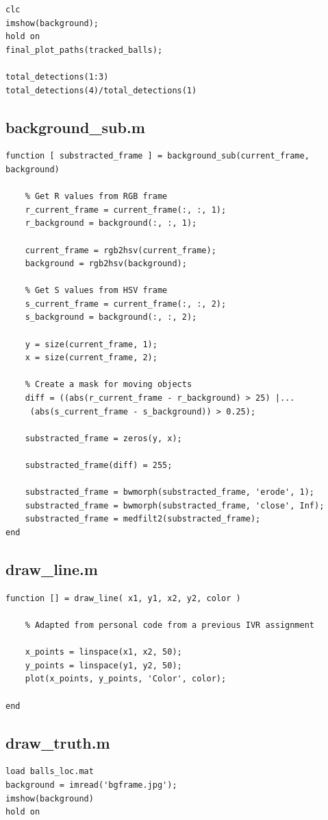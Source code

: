 \documentclass[12pt,a4paper]{article}
\begin{document}
\begin{appendices}
\begin{verbatim}
clc
imshow(background);
hold on
final_plot_paths(tracked_balls);

total_detections(1:3)
total_detections(4)/total_detections(1)
\end{verbatim}

\subsection{background\_sub.m}
\begin{verbatim}
function [ substracted_frame ] = background_sub(current_frame, background)

    % Get R values from RGB frame
    r_current_frame = current_frame(:, :, 1);
    r_background = background(:, :, 1);
    
    current_frame = rgb2hsv(current_frame);
    background = rgb2hsv(background);
    
    % Get S values from HSV frame
    s_current_frame = current_frame(:, :, 2);
    s_background = background(:, :, 2);
    
    y = size(current_frame, 1);
    x = size(current_frame, 2);
    
    % Create a mask for moving objects
    diff = ((abs(r_current_frame - r_background) > 25) |...
     (abs(s_current_frame - s_background)) > 0.25);
    
    substracted_frame = zeros(y, x);
    
    substracted_frame(diff) = 255;
    
    substracted_frame = bwmorph(substracted_frame, 'erode', 1);
    substracted_frame = bwmorph(substracted_frame, 'close', Inf);
    substracted_frame = medfilt2(substracted_frame);
end
\end{verbatim}

\subsection{draw\_line.m}
\begin{verbatim}
function [] = draw_line( x1, y1, x2, y2, color )

    % Adapted from personal code from a previous IVR assignment
	
    x_points = linspace(x1, x2, 50);  
    y_points = linspace(y1, y2, 50); 
    plot(x_points, y_points, 'Color', color);
    
end
\end{verbatim}

\subsection{draw\_truth.m}
\begin{verbatim}
load balls_loc.mat
background = imread('bgframe.jpg');
imshow(background)
hold on


\end{verbatim}
\end{appendices}
\end{document}
